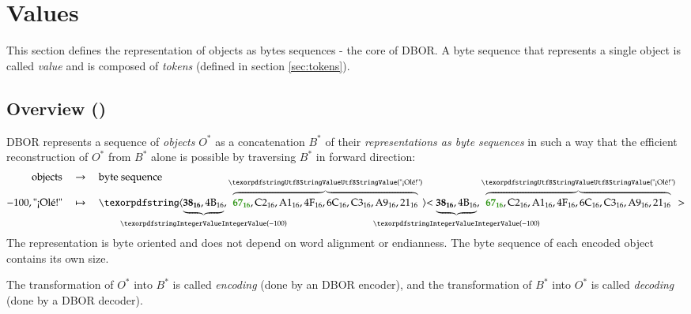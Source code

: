 
\section{Values}
\label{sec:values}

This section defines the representation of objects as bytes sequences - the core of DBOR.
A byte sequence that represents a single object is called \emph{value} and is composed of \emph{tokens}
(defined in section \ref{sec:tokens}).


\subsection{Overview (\DborValue)}
\hypertarget{sec:def:Value}{}

DBOR represents a sequence of \emph{objects} $O^*$ as a concatenation $B^*$ of their \emph{representations as byte
sequences} in such a way that the efficient reconstruction of $O^*$ from $B^*$ alone is possible by traversing $B^*$
in forward direction:
\begin{align*}
    \text{objects} & \quad\rightarrow\quad \text{byte sequence} \\[-2ex]
    -100, \text{"¡Olé!"}
        & \quad\mapsto\quad
    \ByteSequence{
        \underbrace{%
            \DborFirstByteNumber{38}, \DborNextByte{4B}
        }_{\hskip-\textwidth\DborIntegerValue(-100)\hskip-\textwidth},
        \overbrace{%
            \DborFirstByteString{67},
            \DborNextByte{C2}, \DborNextByte{A1},
            \DborNextByte{4F}, \DborNextByte{6C},
            \DborNextByte{C3}, \DborNextByte{A9},
            \DborNextByte{21}
        }^{\DborUtfEightStringValue(\text{"¡Olé!"})}
    }
\end{align*}
The representation is byte oriented and does not depend on word alignment or endianness.
The byte sequence of each encoded object contains its own size.

\medskip
The transformation of $O^*$ into $B^*$ is called \emph{encoding} (done by an DBOR encoder),
and the transformation of $B^*$ into $O^*$ is called \emph{decoding} (done by a DBOR decoder).

